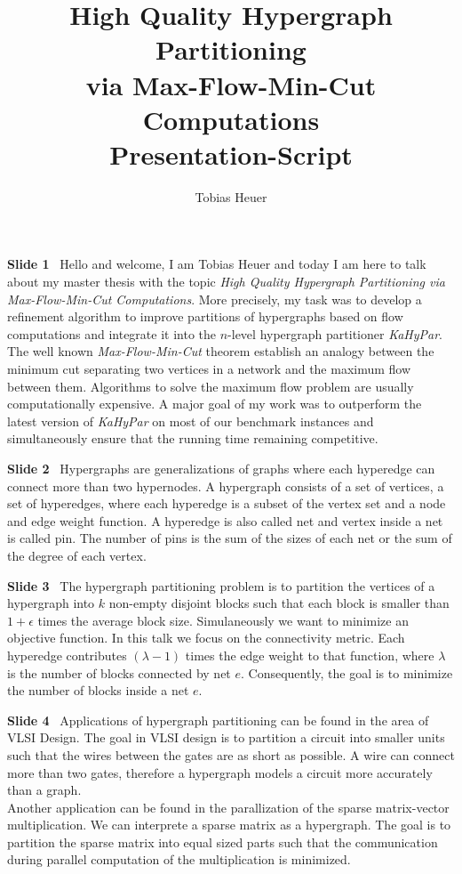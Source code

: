 \documentclass[11pt]{llncs}
\title{High Quality Hypergraph Partitioning \\ via Max-Flow-Min-Cut Computations \\ Presentation-Script }
\author{
    Tobias Heuer
}
\institute{%
Karlsruhe Institute of Technology (KIT), Karlsruhe, Germany.
}
\newcommand{\fakepar}[1]{\medskip\par\textbf{#1}\ }
\begin{document}
\maketitle

\fakepar{Slide 1} Hello and welcome, I am Tobias Heuer and today I am here to talk
about my master thesis with the topic \emph{High Quality Hypergraph Partitioning via
Max-Flow-Min-Cut Computations}.
More precisely, my task was to develop a refinement algorithm to improve
partitions of hypergraphs based on flow computations and integrate it into the $n$-level hypergraph 
partitioner \emph{KaHyPar}. The well known \emph{Max-Flow-Min-Cut} theorem establish an analogy
between the minimum cut separating two vertices in a network and the maximum flow between
them. Algorithms to solve the maximum flow problem are usually computationally expensive. 
A major goal of my work was to outperform the latest version of \emph{KaHyPar} on most
of our benchmark instances and simultaneously ensure that the running time remaining 
competitive.

\fakepar{Slide 2} Hypergraphs are generalizations of graphs where each hyperedge can connect
more than two hypernodes. A hypergraph consists of a set of vertices, a set of hyperedges, where
each hyperedge is a subset of the vertex set and a node and edge weight function. A hyperedge is also
called net and vertex inside a net is called pin. The number of pins is the sum of the sizes of each
net or the sum of the degree of each vertex.

\fakepar{Slide 3} The hypergraph partitioning problem is to partition the vertices of a hypergraph
into $k$ non-empty disjoint blocks such that each block is smaller than $1 + \epsilon$ times the
average block size. Simulaneously we want to minimize an objective function. In this talk we focus
on the connectivity metric. Each hyperedge contributes $(\lambda-1)$ times the edge weight to that
function, where $\lambda$ is the number of blocks connected by net $e$. Consequently, the goal is
to minimize the number of blocks inside a net $e$.

\fakepar{Slide 4} Applications of hypergraph partitioning can be found in the area of VLSI Design.
The goal in VLSI design is to partition a circuit into smaller units such that the wires between the
gates are as short as possible. A wire can connect more than two gates, therefore a hypergraph models
a circuit more accurately than a graph. \\
Another application can be found in the parallization of the sparse matrix-vector multiplication.
We can interprete a sparse matrix as a hypergraph. The goal is to partition the sparse matrix
into equal sized parts such that the communication during parallel computation of the 
multiplication is minimized.
\end{document}
